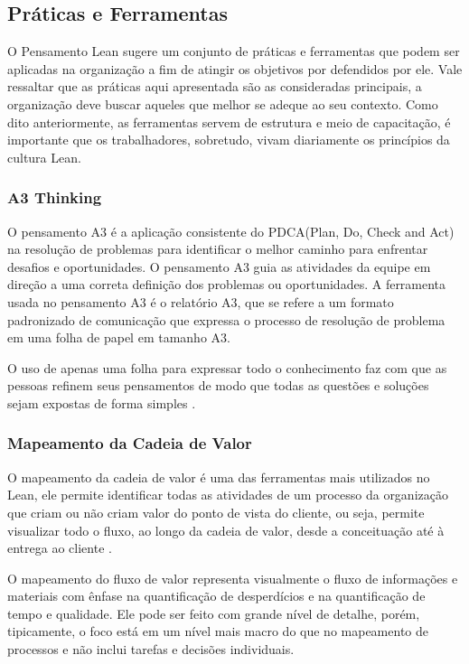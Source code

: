 \subsection[Práticas e Ferramentas]{Práticas e Ferramentas}

O Pensamento Lean sugere um conjunto de práticas e ferramentas que podem ser aplicadas na organização a fim de atingir os objetivos por defendidos por ele. Vale ressaltar que as práticas aqui apresentada são as consideradas principais, a organização deve buscar aqueles que melhor se adeque ao seu contexto. Como dito anteriormente, as ferramentas servem de estrutura e meio de capacitação, é importante que os trabalhadores, sobretudo, vivam diariamente os princípios da cultura Lean.

\subsubsection[A3 Thinking]{A3 Thinking}

O pensamento A3 é a aplicação consistente do PDCA(Plan, Do, Check and Act) na resolução de problemas para identificar o melhor caminho para enfrentar desafios e oportunidades. O pensamento A3 guia as atividades da equipe em direção a uma correta definição dos problemas ou oportunidades. A ferramenta usada no pensamento A3 é o relatório A3, que se refere a um formato padronizado de comunicação que expressa o processo de resolução de problema em uma folha de papel em tamanho A3.

O uso de apenas uma folha para expressar todo o conhecimento faz com que as pessoas refinem seus pensamentos de modo que todas as questões e soluções sejam expostas de forma simples \cite{liker}. 

\subsubsection[Mapeamento da Cadeia de Valor]{Mapeamento da Cadeia de Valor}

O mapeamento da cadeia de valor é uma das ferramentas mais utilizados no Lean, ele permite identificar todas as atividades de um processo da organização que criam ou não criam valor do ponto de vista do cliente, ou seja, permite visualizar todo o fluxo, ao longo da cadeia de valor, desde a conceituação até à entrega ao cliente \cite{bell2011}.

O mapeamento do fluxo de valor representa visualmente o fluxo de informações e materiais com ênfase na quantificação de desperdícios e na quantificação de tempo e qualidade. Ele pode ser feito com grande nível de detalhe, porém, tipicamente, o foco está em um nível mais macro do que no mapeamento de processos  e não inclui tarefas e decisões individuais.


